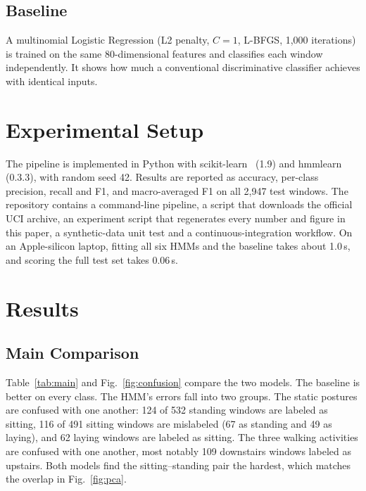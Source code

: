 \documentclass[conference]{IEEEtran}
\begin{document}
\subsection{Baseline}
A multinomial Logistic Regression (L2 penalty, $C=1$, L-BFGS, 1,000 iterations) is trained on the same 80-dimensional features and classifies each window independently. It shows how much a conventional discriminative classifier achieves with identical inputs.

\section{Experimental Setup}
The pipeline is implemented in Python with scikit-learn~\cite{pedregosa2011scikit} (1.9) and hmmlearn~\cite{hmmlearn} (0.3.3), with random seed 42. Results are reported as accuracy, per-class precision, recall and F1, and macro-averaged F1 on all 2,947 test windows. The repository contains a command-line pipeline, a script that downloads the official UCI archive, an experiment script that regenerates every number and figure in this paper, a synthetic-data unit test and a continuous-integration workflow. On an Apple-silicon laptop, fitting all six HMMs and the baseline takes about 1.0\,s, and scoring the full test set takes 0.06\,s.

\section{Results}

\subsection{Main Comparison}
Table~\ref{tab:main} and Fig.~\ref{fig:confusion} compare the two models. The baseline is better on every class. The HMM's errors fall into two groups. The static postures are confused with one another: 124 of 532 standing windows are labeled as sitting, 116 of 491 sitting windows are mislabeled (67 as standing and 49 as laying), and 62 laying windows are labeled as sitting. The three walking activities are confused with one another, most notably 109 downstairs windows labeled as upstairs. Both models find the sitting--standing pair the hardest, which matches the overlap in Fig.~\ref{fig:pca}.
\end{document}
